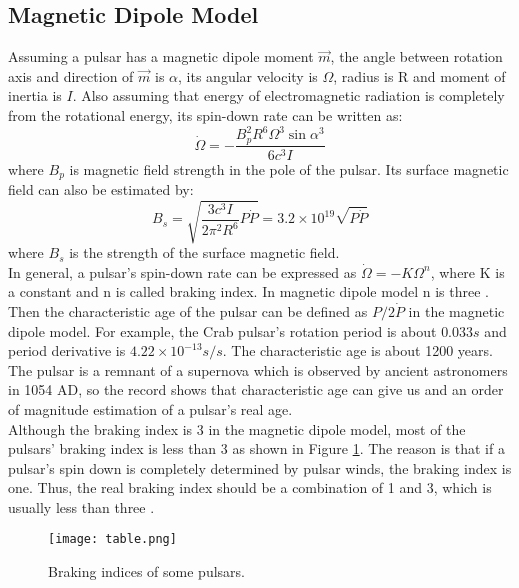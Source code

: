 \documentclass[a4paper, 12pt]{report}
\begin{document}
    \subsection{Magnetic Dipole Model}
      Assuming a pulsar has a magnetic dipole moment $\vec{m}$, the angle between rotation axis and 
      direction of 
      $\vec{m}$ is $\alpha$, its angular velocity is $\Omega$, radius is R and moment of inertia is $I$. 
      Also assuming that energy of electromagnetic radiation is completely from the rotational energy, 
      its spin-down rate can be written as: 
      $$
          \dot{\Omega}=-\frac{B_p^2 R^6 \Omega^3 \sin{\alpha}^3}{6c^3I}
      $$
      where $B_p$ is magnetic field strength in the pole of the pulsar. Its surface magnetic field can 
      also be estimated by:
      $$
          B_s=\sqrt{\frac{3c^3I}{2\pi^2R^6}P\dot{P}}=3.2\times 10^{19}\sqrt{P\dot{P}}
      $$
      where $B_s$ is the strength of the surface magnetic field. \\
      \indent In general, a pulsar's spin-down rate can be expressed as $\dot{\Omega}=-K\Omega^{n}$, 
      where K is a constant and n is called braking index. In magnetic dipole model n is 
      three \citep{Tong2015}. Then the characteristic age of the pulsar can be 
      defined as $P/2\dot{P}$ in the magnetic dipole model. For example, the Crab 
      pulsar's rotation period is about $0.033s$ and period derivative is 
      $4.22\times 10^{-13}s/s$. The characteristic age is about 1200 years. The pulsar 
      is a remnant of a supernova which is observed by ancient astronomers in 1054 
      AD, so the record shows that characteristic age can give us and an order of magnitude 
      estimation of a pulsar's real age. \\
      \indent 
      Although the braking index is 3 in the magnetic dipole model, most of the pulsars' 
      braking index is less than 3 as shown in Figure \ref{fig:braking_index}. The reason is 
      that if a pulsar's spin down is completely determined by pulsar winds, the braking 
      index is one. Thus, the real braking index should be a combination of 1 and 3, which is usually 
      less than three \citep{PhysRevD.91.063007}.
        
      \begin{figure}[!ht]
        \centering
        \texttt{[image: table.png]}
        \caption{Braking indices of some pulsars.}
        \label{fig:braking_index}
      \end{figure}
  
\end{document}
